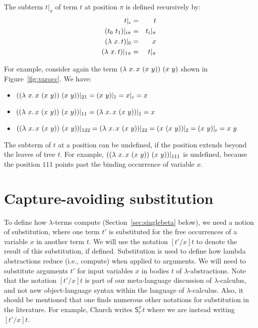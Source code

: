 \begin{definition}
  The subterm $t|_\pi$ of term $t$ at position $\pi$ is defined recursively by:
  \begin{eqnarray*}
    t|_\epsilon & = & t \\
    (t_0\ t_1)|_{i\pi} & = & t_i|_\pi \\
    (\lambda\ x.\, t)|_{0} & = & x \\
    (\lambda\ x.\, t)|_{1\pi} & = & t|_\pi
  \end{eqnarray*}
\end{definition}

For example, consider again the term $(\lambda\ x.\, x\ (x\ y))\ (x\ y)$ shown in Figure~\ref{fig:varocc}.  We have:
\begin{itemize}
  \item $((\lambda\ x.\, x\ (x\ y))\ (x\ y))|_{21} = (x\ y)|_1 = x|_\epsilon = x$
  \item $((\lambda\ x.\, x\ (x\ y))\ (x\ y))|_{11} = (\lambda\ x.\, x\ (x\ y))|_1 = x$
  \item $((\lambda\ x.\, x\ (x\ y))\ (x\ y))|_{122} = (\lambda\ x.\, x\ (x\ y))|_{22} = (x\ (x\ y))|_{2} = (x\ y)|_{\epsilon} = x\ y$
\end{itemize}

The subterm of $t$ at a position can be undefined, if the position extends beyond the leaves of tree $t$.  For example,
$((\lam{x}{x\ (x\ y)})\ (x\ y))|_{111}$ is undefined, because the position $111$ points past the binding occurrence of variable $x$.

\section{Capture-avoiding substitution}
\label{sec:subst}

To define how $\lambda$-terms compute (Section~\ref{sec:singlebeta}
below), we need a notion of substitution, where one term $t'$ is
substituted for the free occurrences of a variable $x$ in another term
$t$.  We will use the notation $[t'/x]t$ to denote the result of this
substitution, if defined.
Substitution is used to define how lambda abstractions reduce (i.e.,
compute) when applied to arguments.  We will need to substitute
arguments $t'$ for input variables $x$ in bodies $t$ of
$\lambda$-abstractions.  Note that the notation $[t'/x]t$ is part of
our meta-language discussion of $\lambda$-calculus, and not new
object-language syntax within the language of $\lambda$-calculus.
Also, it should be mentioned that one finds numerous other notations
for substitution in the literature.  For example, Church writes
$\textsf{S}^x_{t'} t$ where we are instead writing $[t'/x]t$.


